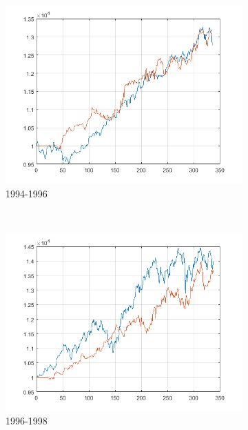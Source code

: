 \documentclass[11pt,a4,twosided,singlespacing,titlepagenumber=on]{scrreprt}
\numberwithin{equation}{chapter} %
\theoremstyle{remark}
\begin{document}
\begin{figure}[H]
\begin{subfigure}[t]{0.32\textwidth}
        \includegraphics[width=1\textwidth]{res/backtest_cpx/3}
        \caption{1994-1996}
    \end{subfigure} \\
    \begin{subfigure}[t]{0.32\textwidth}
        \centering
        \includegraphics[width=1\textwidth]{res/backtest_cpx/4}
        \caption{1996-1998}
    \end{subfigure}
    \begin{subfigure}[t]{0.32\textwidth}
        \centering

\end{subfigure}
\end{figure}
\end{document}

